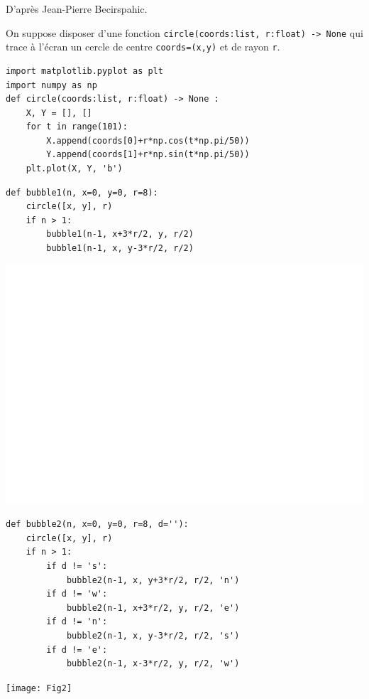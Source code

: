 \setcounter{numques}{0}

\begin{flushright}
\footnotesize{D'après Jean-Pierre Becirspahic.}
\end{flushright}
 On suppose disposer d’une fonction \texttt{circle(coords:list, r:float) -> None} qui trace à l’écran un cercle de centre 
 \texttt{coords=(x,y)} et de rayon \texttt{r}.
\ifprof\else
\begin{lstlisting}
import matplotlib.pyplot as plt
import numpy as np
def circle(coords:list, r:float) -> None :
    X, Y = [], []
    for t in range(101):
        X.append(coords[0]+r*np.cos(t*np.pi/50))
        Y.append(coords[1]+r*np.sin(t*np.pi/50))
    plt.plot(X, Y, 'b')
\end{lstlisting}
\fi

\ifprof
\begin{lstlisting}
def bubble1(n, x=0, y=0, r=8):
    circle([x, y], r)
    if n > 1:
        bubble1(n-1, x+3*r/2, y, r/2)
        bubble1(n-1, x, y-3*r/2, r/2)
\end{lstlisting}
\else
\begin{center}
\includegraphics[width=.3\linewidth]{Fig1}
\end{center}
\fi
{}
\ifprof
\begin{lstlisting}
def bubble2(n, x=0, y=0, r=8, d=''):
    circle([x, y], r)
    if n > 1:
        if d != 's':
            bubble2(n-1, x, y+3*r/2, r/2, 'n')
        if d != 'w':
            bubble2(n-1, x+3*r/2, y, r/2, 'e')
        if d != 'n':
            bubble2(n-1, x, y-3*r/2, r/2, 's')
        if d != 'e':
            bubble2(n-1, x-3*r/2, y, r/2, 'w')
\end{lstlisting}
\else
\begin{center}
\texttt{[image: Fig2]}
\end{center}
\fi